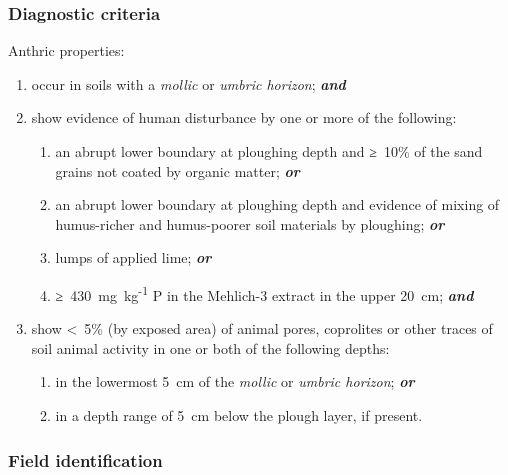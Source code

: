 \documentclass[
  letterpaper,
  DIV=11,
  numbers=noendperiod]{scrreprt}
\providecommand{\tightlist}{%
  \setlength{\itemsep}{0pt}\setlength{\parskip}{0pt}}\usepackage{longtable,booktabs,array}
\begin{document}
\hypertarget{diagnostic-criteria-43}{%
\subsubsection{Diagnostic criteria}\label{diagnostic-criteria-43}}

Anthric properties:

\begin{enumerate}
\def\labelenumi{\arabic{enumi}.}
\item
  occur in soils with a \emph{mollic} or \emph{umbric horizon};
  \textbf{\emph{and}}
\item
  show evidence of human disturbance by one or more of the following:

  \begin{enumerate}
  \def\labelenumii{\alph{enumii}.}
  \tightlist
  \item
    an abrupt lower boundary at ploughing depth and ≥~10\% of the sand
    grains not coated by organic matter; \textbf{\emph{or}}
  \item
    an abrupt lower boundary at ploughing depth and evidence of mixing
    of humus-richer and humus-poorer soil materials by ploughing;
    \textbf{\emph{or}}
  \item
    lumps of applied lime; \textbf{\emph{or}}
  \item
    ≥~430~mg~kg\textsuperscript{-1} P in the Mehlich-3 extract in the
    upper 20~cm; \textbf{\emph{and}}
  \end{enumerate}
\item
  show \textless~5\% (by exposed area) of animal pores, coprolites or
  other traces of soil animal activity in one or both of the following
  depths:

  \begin{enumerate}
  \def\labelenumii{\alph{enumii}.}
  \tightlist
  \item
    in the lowermost 5~cm of the \emph{mollic} or \emph{umbric horizon};
    \textbf{\emph{or}}
  \item
    in a depth range of 5~cm below the plough layer, if present.
  \end{enumerate}
\end{enumerate}

\hypertarget{field-identification-33}{%
\subsubsection{Field identification}\label{field-identification-33}}
\end{document}
